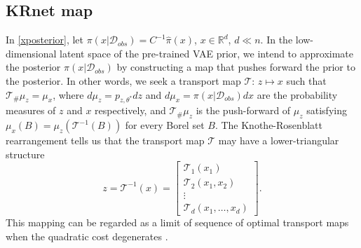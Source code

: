 


\subsection{KRnet map}
In  \eqref{xposterior}, let $\pi(x|\mathcal{D}_{obs})=C^{-1}\hat{\pi}(x)$, $x\in \mathbb{R}^d$, $d\ll n$. In the low-dimensional latent space of the pre-trained VAE prior, we intend to approximate the posterior $\pi(x|\mathcal{D}_{obs})$ by constructing a map that pushes forward the prior to the posterior. In other words, we seek a transport map $\mathcal{T}$: $z \mapsto x$ such that $\mathcal{T}_{\#} \mu_z = \mu_x$, where $d\mu_z=p_{z,\theta^*}dz$ and $d\mu_x=\pi(x|\mathcal{D}_{obs})dx$ are the probability measures of $z$ and $x$ respectively, and $\mathcal{T}_{\#} \mu_{z}$ is the push-forward of $\mu_{z}$ satisfying $\mu_{x}(B) = \mu_{z}(\mathcal{T}^{-1}(B))$ for every Borel set $B$. The Knothe-Rosenblatt rearrangement tells us that the transport map $\mathcal{T}$ may have a lower-triangular structure 
\begin{equation}
    {z} = \mathcal{T}^{-1}({x}) = \left[ 
    \begin{array}{l}
    \mathcal{T}_1(x_1) \\
    \mathcal{T}_2(x_1, x_2) \\
    \vdots \\
    \mathcal{T}_{d}(x_1, \ldots, x_d)
    \end{array}
    \right].
\end{equation} 
This mapping can be regarded as a limit of sequence of optimal transport maps when the quadratic cost degenerates \cite{carlier2010knothe}. 

